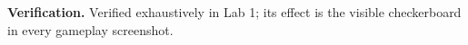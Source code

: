 \documentclass[11pt,a4paper]{article}
\newcommand{\placeholderbox}[2]{%
  \begin{center}
    \setlength{\fboxsep}{10pt}\setlength{\fboxrule}{1pt}
    \fbox{\begin{minipage}[c][#1][c]{0.88\textwidth}\centering
      \textbf{\textcolor{red!60!black}{[PLACEHOLDER -- RESULT NOT YET AVAILABLE]}}\\[6pt]
      \small #2
    \end{minipage}}
  \end{center}}
\begin{document}
\textbf{Verification.} Verified exhaustively in Lab 1; its effect is the
visible checkerboard in every gameplay screenshot.





\end{document}
